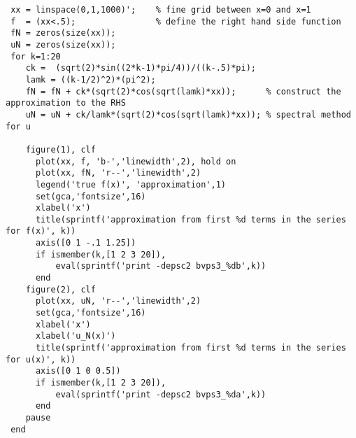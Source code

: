 {\footnotesize \begin{verbatim}
 xx = linspace(0,1,1000)';    % fine grid between x=0 and x=1
 f  = (xx<.5);                % define the right hand side function
 fN = zeros(size(xx));        
 uN = zeros(size(xx));        
 for k=1:20
    ck =  (sqrt(2)*sin((2*k-1)*pi/4))/((k-.5)*pi);
    lamk = ((k-1/2)^2)*(pi^2);
    fN = fN + ck*(sqrt(2)*cos(sqrt(lamk)*xx));      % construct the approximation to the RHS
    uN = uN + ck/lamk*(sqrt(2)*cos(sqrt(lamk)*xx)); % spectral method for u

    figure(1), clf
      plot(xx, f, 'b-','linewidth',2), hold on
      plot(xx, fN, 'r--','linewidth',2)
      legend('true f(x)', 'approximation',1)
      set(gca,'fontsize',16)
      xlabel('x')
      title(sprintf('approximation from first %d terms in the series for f(x)', k))
      axis([0 1 -.1 1.25])
      if ismember(k,[1 2 3 20]), 
          eval(sprintf('print -depsc2 bvps3_%db',k))
      end
    figure(2), clf
      plot(xx, uN, 'r--','linewidth',2)
      set(gca,'fontsize',16)
      xlabel('x')
      xlabel('u_N(x)')
      title(sprintf('approximation from first %d terms in the series for u(x)', k))
      axis([0 1 0 0.5])
      if ismember(k,[1 2 3 20]), 
          eval(sprintf('print -depsc2 bvps3_%da',k))
      end
    pause
 end
\end{verbatim}}
